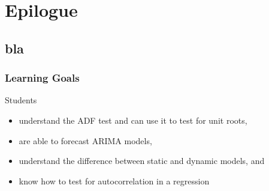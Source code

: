 

\section{Epilogue}\subsection*{bla}
\begin{frame}\frametitle{Learning Goals}
Students
\begin{itemize}
\item understand the ADF test and can use it to test for unit roots,
\item are able to forecast ARIMA models,
\item understand the difference between static and dynamic models, and
\item know how to test for autocorrelation in a regression
\end{itemize}

\end{frame}



